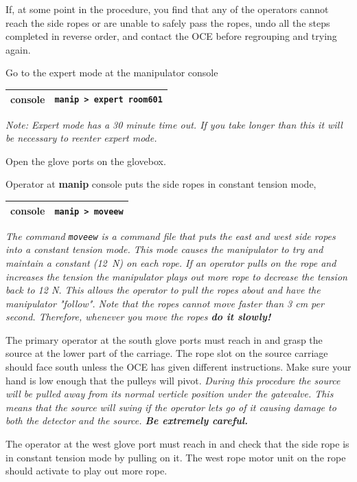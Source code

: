 \documentclass[11pt]{article}
\begin{document}
If, at some point in the procedure, you find that any of the operators cannot reach the side ropes or are unable to safely pass the ropes, undo all the steps completed in reverse order, and contact the OCE before regrouping and trying again. 
\begin{enumarate}
\item \CheckBox[name=aesr1]{} Go to the expert mode at the manipulator console
\begin{center}
\begin{tabular}{|c|c|}
\hline
console & \verb+manip > expert room601+\\
\hline
\end{tabular}
\end{center}
{\it Note: Expert mode has a 30 minute time out. If you take longer than this it will be necessary to reenter expert mode.}
\item \CheckBox[name=aesr2]{} Open the glove ports on the glovebox.
\item \CheckBox[name=aesr3]{} Operator at {\bf manip} console puts the side ropes in constant tension mode,
\begin{center}
\begin{tabular}{|c|c|}
\hline
console & \verb+manip > moveew+\\
\hline
\end{tabular}
\end{center}
{\it The command \verb+moveew+ is a command file that puts the east and west side ropes into a constant tension mode. This mode causes the manipulator to try and maintain a constant (12~N) on each rope. If an operator pulls on the rope and increases the tension the manipulator plays out more rope to decrease the tension back to 12 N. This allows the operator to pull the ropes about and have the manipulator "follow". Note that the ropes cannot move faster than 3 cm per second. Therefore, whenever you move the ropes {\bf do it slowly!}}
\item \CheckBox[name=aesr4]{} The primary operator at the south glove ports must reach in and grasp the source at the lower part of the carriage. The rope slot on the source carriage should face south unless the OCE has given different instructions. Make sure your hand is low enough that the pulleys will pivot. {\it During this procedure the source will be pulled away from its normal verticle position under the gatevalve. This means that the source will swing if the operator lets go of it causing damage to both the detector and the source. {\bf Be extremely careful.}}
\item \CheckBox[name=aesr5]{} The operator at the west glove port must reach in and check that the side rope is in constant tension mode by pulling on it. The west rope motor unit on the rope should activate to play out more rope.

\end{enumarate}
\end{document}
